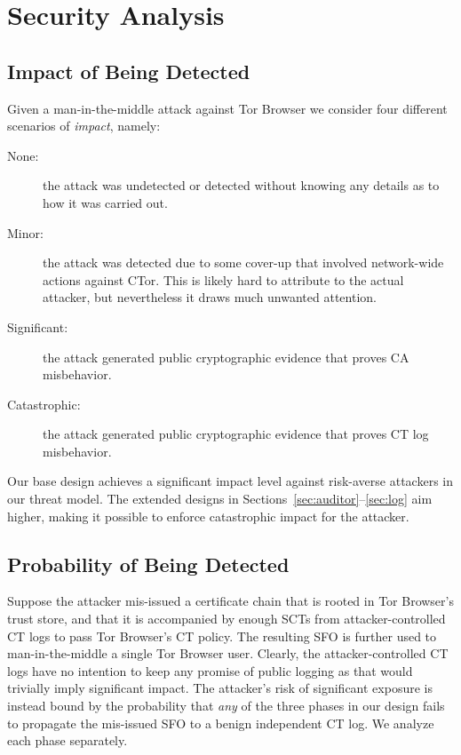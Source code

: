 \section{Security Analysis} \label{sec:analysis}

\subsection{Impact of Being Detected} \label{sec:analysis:impact}
Given a man-in-the-middle attack against Tor Browser we consider four
different scenarios of \emph{impact}, namely:
\begin{description}
	\item[None:] the attack was undetected or detected without knowing any
		details as to how it was carried out.
	\item[Minor:] the attack was detected due to some cover-up that involved
		network-wide actions against CTor.  This is likely hard to attribute to
		the actual attacker, but nevertheless it draws much unwanted attention.
	\item[Significant:] the attack generated public cryptographic evidence
		that proves CA misbehavior.
	\item[Catastrophic:] the attack generated public cryptographic evidence
		that proves CT log misbehavior.
\end{description}

Our base design achieves a significant impact level against risk-averse
attackers in our threat model.  The extended designs in
Sections~\ref{sec:auditor}--\ref{sec:log} aim higher, making it possible
to enforce catastrophic impact for the attacker.

\subsection{Probability of Being Detected} \label{sec:analysis:pr}
Suppose the attacker mis-issued a certificate chain that is rooted in Tor
Browser's trust store, and that it is accompanied by enough SCTs from
attacker-controlled CT logs to pass Tor Browser's CT policy.  The resulting SFO
is further used to man-in-the-middle a single Tor Browser user.  Clearly, the
attacker-controlled CT logs have no intention to keep any promise of public
logging as that would trivially imply significant impact.  The attacker's risk
of significant exposure is instead bound by the probability that \emph{any} of
the three phases in our design fails to propagate the mis-issued SFO to a benign
independent CT log.  We analyze each phase separately.

